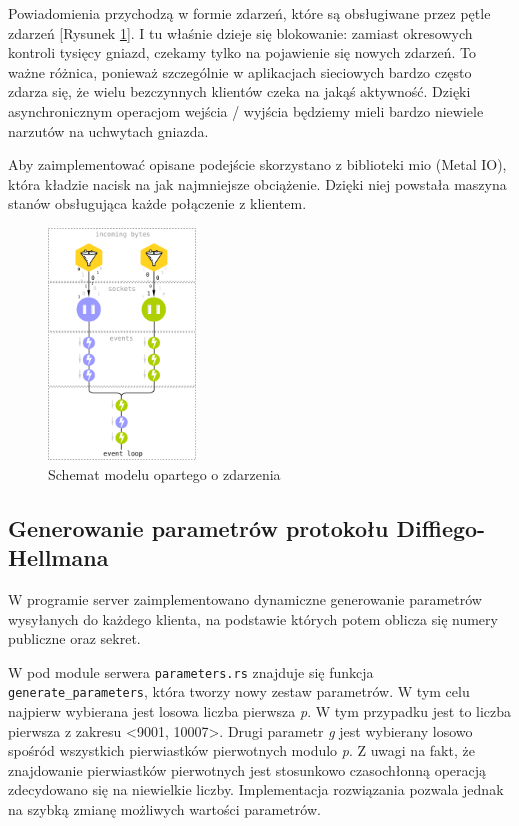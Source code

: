 \documentclass[11pt]{article}
\begin{document}
Powiadomienia przychodzą w formie zdarzeń, które są obsługiwane przez pętle zdarzeń [Rysunek \ref{fig:model}]. I tu właśnie dzieje się blokowanie: zamiast okresowych kontroli tysięcy gniazd, czekamy tylko na pojawienie się nowych zdarzeń. To ważne różnica, ponieważ szczególnie w aplikacjach sieciowych bardzo często zdarza się, że wielu bezczynnych klientów czeka na jakąś aktywność. Dzięki asynchronicznym operacjom wejścia / wyjścia będziemy mieli bardzo niewiele narzutów na uchwytach gniazda.

Aby zaimplementować opisane podejście skorzystano z biblioteki mio (Metal IO), która kładzie nacisk na jak najmniejsze obciążenie. Dzięki niej powstała maszyna stanów obsługująca każde połączenie z klientem.

\begin{figure}
    \centering
    \includegraphics[width=0.35\textwidth]{io-multiplex.png}
    \caption{Schemat modelu opartego o zdarzenia}
    \label{fig:model}
\end{figure}

\subsection{Generowanie parametrów protokołu Diffiego-Hellmana}

W programie server zaimplementowano dynamiczne generowanie parametrów wysyłanych do każdego klienta, na podstawie których potem oblicza się numery publiczne oraz sekret. 

W pod module serwera \texttt{parameters.rs} znajduje się funkcja \texttt{generate\_parameters}, która tworzy nowy zestaw parametrów. W tym celu najpierw wybierana jest losowa liczba pierwsza \textit{p}. W tym przypadku jest to liczba pierwsza z zakresu <9001, 10007>. Drugi parametr \textit{g} jest wybierany losowo spośród wszystkich pierwiastków pierwotnych modulo \textit{p}. Z uwagi na fakt, że znajdowanie pierwiastków pierwotnych jest stosunkowo czasochłonną operacją zdecydowano się na niewielkie liczby. Implementacja rozwiązania pozwala jednak na szybką zmianę możliwych wartości parametrów. 
\end{document}
